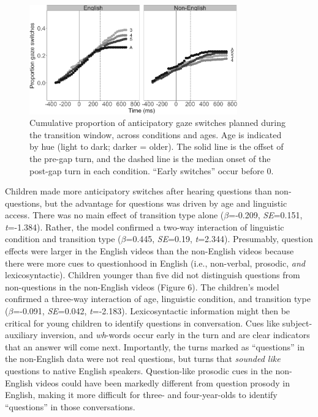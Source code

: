 \documentclass[authoryear, 12pt]{elsarticle}
\begin{document}
\begin{figure}[ht]
\begin{center}
\includegraphics[width=0.8\textwidth]{figures/FIG-cumulative-FL.png}
\end{center}
\caption{Cumulative proportion of anticipatory gaze switches planned during the transition window, across conditions and ages. Age is indicated by hue (light to dark; darker = older). The solid line is the offset of the pre-gap turn, and the dashed line is the median onset of the post-gap turn in each condition. ``Early switches'' occur before 0.} 
\label{cumulativeFL}
\end{figure}

Children made more anticipatory switches after hearing questions than non-questions, but the advantage for questions was driven by age and linguistic access. There was no main effect of transition type alone (\textit{$\beta$}=-0.209, \textit{SE}=0.151, \textit{t}=-1.384). Rather, the model confirmed a two-way interaction of linguistic condition and transition type (\textit{$\beta$}=0.445, \textit{SE}=0.19, \textit{t}=2.344). Presumably, question effects were larger in the English videos than the non-English videos because there were more cues to questionhood in English (i.e., non-verbal, prosodic, \textit{and} lexicosyntactic). Children younger than five did not distinguish questions from non-questions in the non-English videos (Figure 6). The children's model confirmed a three-way interaction of age, linguistic condition, and transition type (\textit{$\beta$}=-0.091, \textit{SE}=0.042, \textit{t}=-2.183). Lexicosyntactic information might then be critical for young children to identify questions in conversation. Cues like subject-auxiliary inversion, and \textit{wh}-words occur early in the turn and are clear indicators that an answer will come next. Importantly, the turns marked as ``questions'' in the non-English data were not real questions, but turns that \textit{sounded like} questions to native English speakers. Question-like prosodic cues in the non-English videos could have been markedly different from question prosody in English, making it more difficult for three- and four-year-olds to identify ``questions'' in those conversations.
\end{document}
